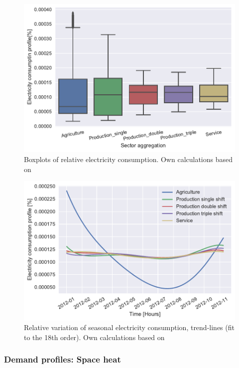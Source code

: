 \documentclass[review]{elsarticle}
\begin{document}
\begin{figure}[H]
\centering
\includegraphics[width=\linewidth]{Img/profiles/boxplots.pdf}
\caption{Boxplots of relative electricity consumption. Own calculations based on \cite{Energinet.dk,NordPool2016,ElforbrugsPanelerne2015,Andersen2013a,Andersen2013b,VM2015}}
\label{fig:boxplots} 
\end{figure}

\begin{figure}[H]
\centering
\includegraphics[width=\linewidth]{Img/profiles/trendlines.pdf}
\caption{Relative variation of seasonal electricity consumption, trend-lines (fit to the 18th order). Own calculations based on \cite{Energinet.dk,NordPool2016,ElforbrugsPanelerne2015,Andersen2013a,Andersen2013b,VM2015}}
\label{fig:trendlines}
\end{figure}

\subsubsection{Demand profiles: Space heat}
\end{document}
